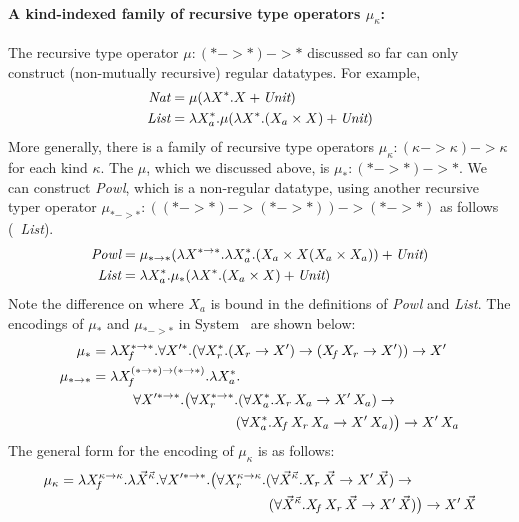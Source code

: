 \paragraph{A kind-indexed family of recursive type operators $\mu_\kappa$:}
The recursive type operator $\mu : (* -> *) -> *$ discussed so far can only
construct (non-mutually recursive) regular datatypes. For example,
\begin{align*}
\textit{Nat} &= \mu(\lambda X^{*}.X + \textit{Unit}) \\
\textit{List} &= \lambda X_a^{*}.\mu(\lambda X^{*}.(X_a\times X) + \textit{Unit})
\end{align*}
More generally, there is a family of recursive type operators
$\mu_\kappa : (\kappa -> \kappa) -> \kappa$ for each kind $\kappa$.
The $\mu$, which we discussed above, is $\mu_{*} : (* -> *) -> *$.
We can construct \textit{Powl}, which is a non-regular datatype, using another
recursive typer operator $\mu_{* -> *} : ((*-> *) -> (*-> *)) -> (*-> *) $
as follows (\cf\ \textit{List}).
\begin{align*}
\textit{Powl} &= \mu_{* -> *}(\lambda X^{* -> *}.\lambda X_a^{*}.
                        (X_a\times X(X_a\times X_a)) + \textit{Unit}) \\
\textit{List} &= \lambda X_a^{*}.\mu_{*}(\lambda X^{*}.(X_a\times X) + \textit{Unit})
\end{align*}
Note the difference on where $X_a$ is bound in the definitions of \textit{Powl}
and \textit{List}. The encodings of $\mu_{*}$ and $\mu_{*-> *}$ in System \Fw\ 
are shown below:
\begin{align*}
\mu_{*} &=
 \lambda X_{\!f}^{* -> *}.\forall X'^{*}.
 (\forall X_r^{*}.(X_r -> X') -> (X_{\!f}\,X_r -> X')) -> X' \\
\mu_{* -> *} &=
 \lambda X_{\!f}^{(*-> *) -> (*-> *)}.\lambda X_a^{*}.\\&\qquad\quad \forall X'^{*-> *}.
 \big(\forall X_r^{*-> *}.
        (\forall X_a^{*}.X_r\,X_a -> X'\,X_a) -> \\&\qquad\qquad\qquad\qquad\qquad~
        (\forall X_a^{*}.X_{\!f}\,X_r\,X_a -> X'\,X_a)\big) -> X'\,X_a
\end{align*}
The general form for the encoding of $\mu_\kappa$
is as follows:
\begin{align*}
\mu_{\kappa} &=
 \lambda X_{\!f}^{\kappa -> \kappa}.\lambda \vec{X}^{\vec{\kappa}}.
 \forall X'^{*-> *}.
 \big(\forall X_r^{\kappa -> \kappa}.
 (\forall \vec{X}^{\vec{\kappa}}.X_r\,\vec{X} -> X'\,\vec{X}) -> \\
 &\qquad\qquad\qquad\qquad\qquad\qquad\qquad\quad
 (\forall \vec{X}^{\vec{\kappa}}.X_{\!f}\,X_r\,\vec{X} -> X'\,\vec{X})
 \big) -> X'\,\vec{X}
\end{align*}
